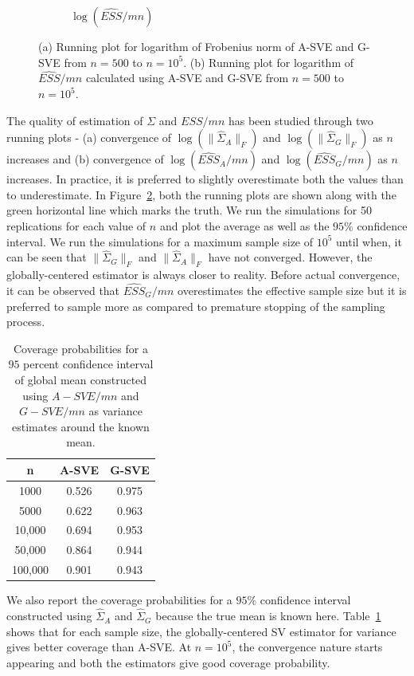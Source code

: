 \documentclass[11pt]{article}
\theoremstyle{remark}
\begin{document}
\begin{figure}[htbp]
\begin{subfigure}{0.4\textwidth}
      \caption{$\log(\hat{ESS}/mn)$}
      \label{subfig:var-frob}
    \end{subfigure}
    \caption{(a) Running plot for logarithm of Frobenius norm of A-SVE and G-SVE from $n = 500$ to $n = 10^5$. (b) Running plot for logarithm of $\hat{ESS}/mn$ calculated using A-SVE and G-SVE from $n=500$ to $n=10^5$.}
    \label{fig:var-frob_n_ess}
\end{figure}

The quality of estimation of $\Sigma$ and $ESS/mn$ has been studied through two running plots - (a) convergence of $\log(\|\hat{\Sigma}_A\|_F)$ and $\log(\|\hat{\Sigma}_G\|_F)$ as $n$ increases and (b) convergence of $\log(\hat{ESS}_A/mn)$ and $\log(\hat{ESS}_G/mn)$ as $n$ increases. In practice, it is preferred to slightly overestimate both the values than to underestimate. In Figure~\ref{fig:var-frob_n_ess}, both the running plots are shown along with the green horizontal line which marks the truth. We run the simulations for 50 replications for each value of $n$ and plot the average as well as the $95\%$ confidence interval. We run the simulations for a maximum sample size of $10^5$ until when, it can be seen that $\|\hat{\Sigma}_G\|_F$ and $\|\hat{\Sigma}_A\|_F$ have not converged. However, the globally-centered estimator is always closer to reality. Before actual convergence, it can be observed that $\hat{ESS}_G/mn$ overestimates the effective sample size but it is preferred to sample more as compared to premature stopping of the sampling process.\\


\begin{table}[h]
    \centering
    \begin{tabular}{|c|c|c|}
    n & A-SVE & G-SVE\\
    \hline
    1000 & 0.526 & 0.975\\
    5000 & 0.622 & 0.963\\
    10,000 & 0.694 & 0.953\\
    50,000 & 0.864 & 0.944\\
    100,000 & 0.901 & 0.943\\
    \end{tabular}
    \caption{Coverage probabilities for a $95$ percent confidence interval of global mean constructed using $A-SVE/mn$ and $G-SVE/mn$ as variance estimates around the known mean.}
    \label{tab:var-coverage}
\end{table}


We also report the coverage probabilities for a $95\%$ confidence interval constructed using $\hat{\Sigma}_A$ and $\hat{\Sigma}_G$ because the true mean is known here. Table~\ref{tab:var-coverage} shows that for each sample size, the globally-centered SV estimator for variance gives better coverage than A-SVE. At $n=10^5$, the convergence nature starts appearing and both the estimators give good coverage probability.
\end{document}
